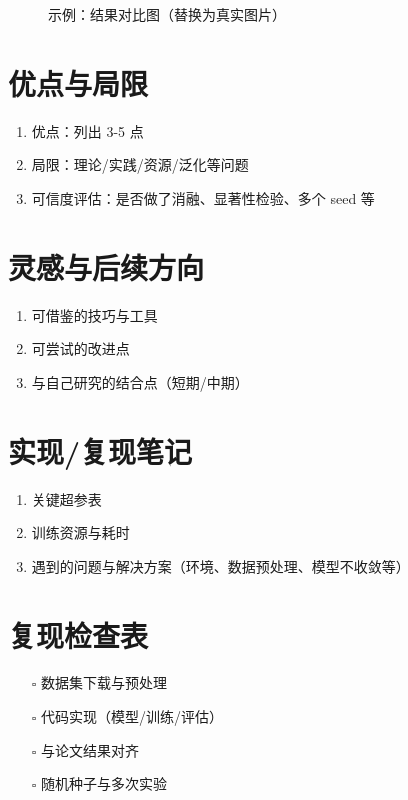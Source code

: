 \documentclass[11pt,a4paper]{article}
\begin{document}
\begin{figure}[H]
    \centering
    \caption{示例：结果对比图（替换为真实图片）}
\end{figure}

\section{优点与局限}
\begin{enumerate}
    \item 优点：列出 3-5 点
    \item 局限：理论/实践/资源/泛化等问题
    \item 可信度评估：是否做了消融、显著性检验、多个 seed 等
\end{enumerate}

\section{灵感与后续方向}
\begin{enumerate}
    \item 可借鉴的技巧与工具
    \item 可尝试的改进点
    \item 与自己研究的结合点（短期/中期）
\end{enumerate}

\section{实现/复现笔记}
\begin{enumerate}
    \item 关键超参表
    \item 训练资源与耗时
    \item 遇到的问题与解决方案（环境、数据预处理、模型不收敛等）
\end{enumerate}

\section{复现检查表}
\begin{enumerate}
    \item [\(\square\)] 数据集下载与预处理
    \item [\(\square\)] 代码实现（模型/训练/评估）
    \item [\(\square\)] 与论文结果对齐
    \item [\(\square\)] 随机种子与多次实验
\end{enumerate}
\end{document}
